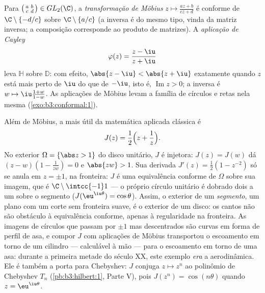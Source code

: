 \begin{example}
\label{ex:b3:conformal:mobius}
Para $\bigl(\begin{smallmatrix}a & b\\ c &
d\end{smallmatrix}\bigr) \in GL_2(\C)$, a \emph{transformação de Möbius} $z \mapsto
\frac{az + b}{cz + d}$ é conforme de $\C\setminus\{-d/c\}$ sobre $\C\setminus\{a/c\}$ (a inversa é do mesmo tipo,
vinda da matriz inversa; a composição corresponde ao produto de
matrizes). A \emph{aplicação de Cayley}
\[
\varphi(z) = \frac{z - \iu}{z + \iu}
\]
leva $\mathbb H$  sobre $\mathbb D$: com efeito, $\abs{z
- \iu} < \abs{z + \iu}$ exatamente quando
$z$ está mais perto de $\iu$ do que de $-\iu$, isto é, $\operatorname{Im}z > 0$; a
inversa é $w \mapsto \iu\frac{1 + w}{1 - w}$. As aplicações de Möbius levam a família de círculos e
retas nela mesma (\cref{exo:b3:conformal:1}).
\end{example}

\begin{example}\label{ex:b3:conformal:joukowski}
Além de Möbius, a  mais útil da matemática aplicada
clássica é
\[
J(z) = \frac12\Bigl(z + \frac1z\Bigr) .
\]
No exterior $\Omega = \{\abs z > 1\}$ do disco unitário, $J$ é injetora: $J(z) = J(w)$ dá $(z - w)(1 -
\frac1{zw}) = 0$ e
$\abs{zw} > 1$. Sua derivada $J'(z) =
\frac12(1 - z^{-2})$ só se anula em $z = \pm1$, na fronteira: $J$ é uma
equivalência conforme de $\Omega$ sobre sua imagem, que é $\C\setminus\intcc{-1}1$ --- o
próprio círculo unitário é dobrado dois a um sobre o segmento ($J(\eu^{\iu\theta}) = \cos\theta$).
Assim, o exterior de um \emph{segmento}, um plano com um corte sem
fronteira suave, é  o exterior de um disco: os cantos não
são obstáculo à equivalência conforme, apenas à regularidade na
fronteira. As imagens de círculos que passam por $\pm1$ mas
descentrados são curvas em forma de perfil de asa, e compor $J$ com
aplicações de Möbius transportou o escoamento em torno de um cilindro
--- calculável à mão --- para o escoamento em torno de uma asa: durante
a primeira metade do século XX, este exemplo \emph{era} a aerodinâmica.
Ele é também a porta para Chebyshev: $J$ conjuga $z \mapsto z^n$ ao polinômio de
Chebyshev $T_n$ (\cref{pb:b3:hilbert:1}, Parte V), pois $J(z^n) = \cos(n\theta)$ quando $z = \eu^{\iu\theta}$.
\end{example}

